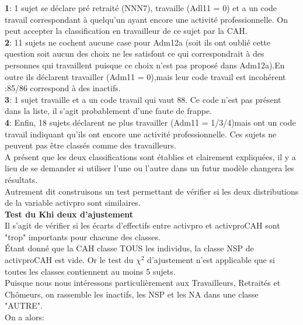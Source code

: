 \documentclass{book}
\begin{document}
\bigskip

\noindent
\textbf{1}: 1 sujet se déclare pré retraité (NNN7), travaille (Adl11 = 0) et a un code travail correspondant à quelqu'un ayant encore une activité professionnelle. On peut accepter la classification en travailleur de ce sujet par la CAH.\\
\textbf{2}: 11 sujets ne cochent aucune case pour Adm12a (soit ils ont oublié cette question soit aucun des choix ne les satisfont ce qui correspondrait à des personnes qui travaillent puisque ce choix n'est pas proposé dans Adm12a).En outre ils déclarent travailler (Adm11 = 0),mais leur code travail est incohérent :85/86 correspond à des inactifs.\\
\textbf{3}: 1 sujet travaille et a un code travail qui vaut 88. Ce code n'est pas présent dans la liste, il s'agit probablement d'une faute de frappe.\\
\textbf{4}: Enfin, 18 sujets déclarent ne plus travailler (Adm11 = 1/3/4)mais ont un code travail indiquant qu'ils ont encore une activité professionnelle. Ces sujets ne peuvent pas être classés comme des travailleurs.\\

\newpage
\noindent
A présent que les deux classifications sont établies et clairement expliquées, il y a lieu de se demander si utiliser l'une ou l'autre dans un futur modèle changera les résultats.\\
Autrement dit construisons un test permettant de vérifier si les deux distributions de la variable activpro sont similaires.\\

\noindent
\textbf{Test du Khi deux d'ajustement}\\
Il s'agit de vérifier si les écarts d'effectifs entre activpro et activproCAH sont "trop" importants pour chacune des classes.\\
Étant donné que la CAH classe TOUS les individus, la classe NSP de activproCAH est vide.
Or le test du $\chi^2$ d'ajustement n'est applicable que si toutes les classes contiennent au moins 5 sujets.\\
Puisque nous nous intéressons particulièrement aux Travailleurs, Retraités et Chômeurs, on rassemble les inactifs, les NSP et les NA dans une classe "AUTRE".\\
\noindent
On a alors:\\
\end{document}
